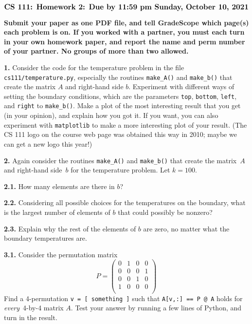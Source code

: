 \documentclass[11pt]{article}
\begin{document}
$$\mbox{\Large \bf CS 111: Homework 2: Due by 11:59 pm Sunday, October 10, 2021}$$
\par\smallskip\noindent
{\bf Submit your paper as one PDF file,
and tell GradeScope which page(s) each problem is on.
If you worked with a partner, you must each turn in your own 
homework paper, and report the name and perm number of your partner.
No groups of more than two allowed.
}

\par\bigskip
{\bf 1.}
Consider the code for the temperature problem in 
the file {\tt cs111/temperature.py}, 
especially the routines {\tt make\_A()} and {\tt make\_b()}
that create the matrix $A$ and right-hand side $b$.
Experiment with different ways of setting the boundary conditions,
which are the parameters {\tt top}, {\tt bottom}, {\tt left}, and {\tt right} 
to {\tt make\_b()}.
Make a plot of the most interesting result that you get (in your opinion), 
and explain how you got it. 
If you want, you can also experiment with {\tt matplotlib} 
to make a more interesting plot of your result. 
(The CS 111 logo on the course web page was obtained this way in 2010; 
maybe we can get a new logo this year!)

\par\bigskip
{\bf 2.}
Again consider the routines {\tt make\_A()} and {\tt make\_b()}
that create the matrix~$A$ and right-hand side~$b$ for the temperature problem.
Let $k=100$.

\par\medskip
{\bf 2.1.}
How many elements are there in $b$?

\par\medskip
{\bf 2.2.}
Considering all possible choices for the temperatures on the boundary,
what is the largest number of elements of $b$ that could possibly 
be nonzero? 

\par\medskip
{\bf 2.3.}
Explain why the rest of the elements of $b$ are zero, no matter
what the boundary temperatures are.

\par\bigskip
{\bf 3.1.} Consider the permutation matrix 
$$P =
   \left(
   \begin{array}{cccc}
    0 & 1 & 0 & 0 \\ 	
    0 & 0 & 0 & 1 \\ 	
    0 & 0 & 1 & 0 \\ 	
    1 & 0 & 0 & 0 \\ 	
   \end{array} \right)
$$
Find a 4-permutation {\tt v = [ something ]}
such that {\tt A[v,:] == P @ A} holds for
{\em every}\, 4-by-4 matrix $A$.
Test your answer by running a few lines of Python, 
and turn in the result.
\end{document}
